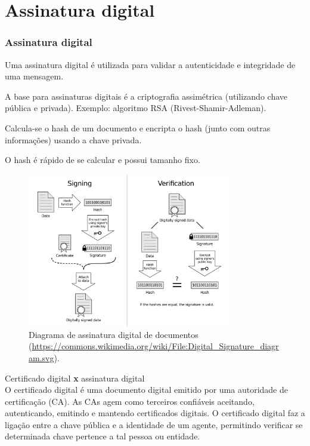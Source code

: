 \section{Assinatura digital}

\begin{frame}[allowframebreaks]
\frametitle{Assinatura digital}
Uma assinatura digital é utilizada para validar a autenticidade e integridade de uma mensagem.

\vspace{3ex}
A base para assinaturas digitais é a criptografia assimétrica (utilizando chave pública e privada).
Exemplo: algoritmo RSA (Rivest-Shamir-Adleman).

\vspace{3ex}
Calcula-se o hash de um documento e encripta o hash (junto com outras informações) usando a chave privada. 

\vspace{3ex} 
O hash é rápido de se calcular e possui tamanho fixo.

\begin{figure}[h]
\centering
\includegraphics[width=0.8\textwidth,height=0.8\textheight,keepaspectratio]{figures/digitalsignaturediagram.pdf}
\caption{Diagrama de assinatura digital de documentos (\url{https://commons.wikimedia.org/wiki/File:Digital_Signature_diagram.svg}).}
\label{fig-digi-sign}
\end{figure}

Certificado digital \textbf{x} assinatura digital\\
O certificado digital é uma documento digital emitido por uma autoridade de certificação (CA). 
As CAs agem como terceiros confiáveis aceitando, autenticando, emitindo e mantendo certificados digitais. 
O certificado digital faz a ligação entre a chave pública e a identidade de um agente, permitindo
verificar se determinada chave pertence a tal pessoa ou entidade.

\end{frame}



